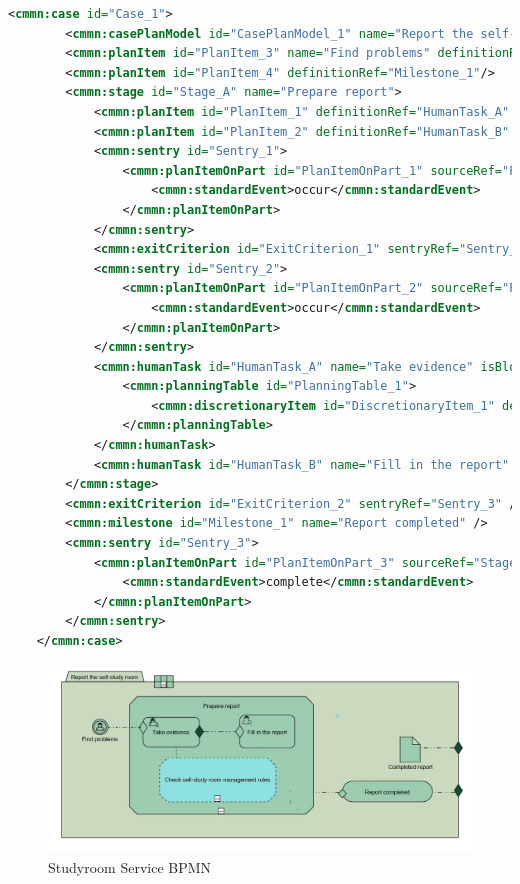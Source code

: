 \documentclass[runningheads]{llncs}
\begin{document}
	\begin{lstlisting}[language={XML}]
	<cmmn:case id="Case_1">
		<cmmn:casePlanModel id="CasePlanModel_1" name="Report the self-study room">
		<cmmn:planItem id="PlanItem_3" name="Find problems" definitionRef="UserEventListener_1"/>
		<cmmn:planItem id="PlanItem_4" definitionRef="Milestone_1"/>
		<cmmn:stage id="Stage_A" name="Prepare report">
			<cmmn:planItem id="PlanItem_1" definitionRef="HumanTask_A" />
			<cmmn:planItem id="PlanItem_2" definitionRef="HumanTask_B" />
			<cmmn:sentry id="Sentry_1">
				<cmmn:planItemOnPart id="PlanItemOnPart_1" sourceRef="PlanItem_3">
					<cmmn:standardEvent>occur</cmmn:standardEvent>
				</cmmn:planItemOnPart>
			</cmmn:sentry>
			<cmmn:exitCriterion id="ExitCriterion_1" sentryRef="Sentry_2" />
			<cmmn:sentry id="Sentry_2">
				<cmmn:planItemOnPart id="PlanItemOnPart_2" sourceRef="PlanItem_2">
					<cmmn:standardEvent>occur</cmmn:standardEvent>
				</cmmn:planItemOnPart>
			</cmmn:sentry>
			<cmmn:humanTask id="HumanTask_A" name="Take evidence" isBlocking="true">
				<cmmn:planningTable id="PlanningTable_1">
					<cmmn:discretionaryItem id="DiscretionaryItem_1" definitionRef="Check self-study room management rules" />
				</cmmn:planningTable>
			</cmmn:humanTask>
			<cmmn:humanTask id="HumanTask_B" name="Fill in the report" isBlocking="true" />
		</cmmn:stage>
		<cmmn:exitCriterion id="ExitCriterion_2" sentryRef="Sentry_3" />
		<cmmn:milestone id="Milestone_1" name="Report completed" />
		<cmmn:sentry id="Sentry_3">
			<cmmn:planItemOnPart id="PlanItemOnPart_3" sourceRef="Stage_A">
				<cmmn:standardEvent>complete</cmmn:standardEvent>
			</cmmn:planItemOnPart>
		</cmmn:sentry>
	</cmmn:case>

	\end{lstlisting}
	\begin{figure}
		\centering %
		\includegraphics[width=1.0\textwidth]{figure/llt/selfstudyroombpmn} %
		\caption{Studyroom Service BPMN} %
		\label{selfstudyroombpmn} %
	\end{figure}
\end{document}
